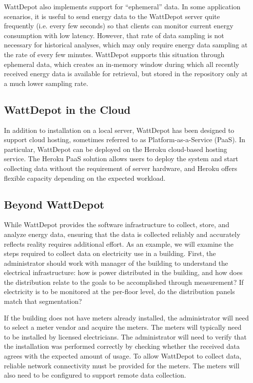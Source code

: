 WattDepot also implements support for ``ephemeral'' data. In some application scenarios, it is useful to send energy data to the WattDepot server quite frequently (i.e. every few seconds) so that clients can monitor current energy consumption with low latency. However, that rate of data sampling is not necessary for historical analyses, which may only require energy data sampling at the rate of every few minutes. WattDepot supports this situation through ephemeral data, which creates an in-memory window during which all recently received energy data is available for retrieval, but stored in the repository only at a much lower sampling rate.

\subsection{WattDepot in the Cloud}

In addition to installation on a local server, WattDepot has been designed to support cloud hosting, sometimes referred to as Platform-as-a-Service (PaaS). In particular, WattDepot can be deployed on the Heroku \cite {HerokuHomePage} cloud-based hosting service. The Heroku PaaS solution allows users to deploy the system and start collecting data without the requirement of server hardware, and Heroku offers flexible capacity depending on the expected workload.

\subsection{Beyond WattDepot}

While WattDepot provides the software infrastructure to collect, store, and analyze energy data, ensuring that the data is collected reliably and accurately reflects reality requires additional effort. As an example, we will examine the steps required to collect data on electricity use in a building. First, the administrator should work with manager of the building to understand the electrical infrastructure: how is power distributed in the building, and how does the distribution relate to the goals to be accomplished through measurement? If electricity is to be monitored at the per-floor level, do the distribution panels match that segmentation?

If the building does not have meters already installed, the administrator will need to select a meter vendor and acquire the meters. The meters will typically need to be installed by licensed electricians. The administrator will need to verify that the installation was performed correctly by checking whether the received data agrees with the expected amount of usage. To allow WattDepot to collect data, reliable network connectivity must be provided for the meters. The meters will also need to be configured to support remote data collection.

